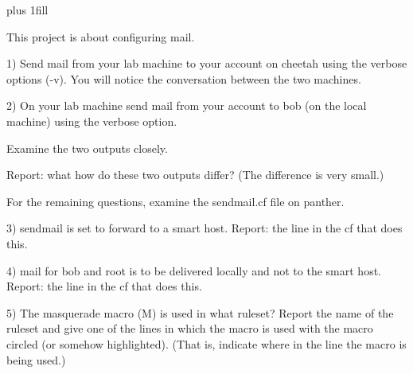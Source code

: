 
\rightskip=0pt plus 1fill

\parindent 0pt

This project is about configuring mail.

1) Send mail from your lab machine to your account on {\ltt{}cheetah}
using the verbose options ({\ltt{}-v}).
You will notice the conversation between the two machines.

2) On your lab machine send mail from your account to bob (on the
local machine) using the verbose option.

Examine the two outputs closely.

Report: what how do these two outputs differ?
(The difference is very small.)

For the remaining questions, examine the {\ltt{}sendmail.cf}
file on {\ltt{}panther}.

3) sendmail is set to forward to a smart host.
Report: the line in the {\ltt{}cf} that does this.

4) mail for {\ltt{}bob} and {\ltt{}root} is to be delivered locally and
not to the smart host.
Report: the line in the {\ltt{}cf} that does this.

5) The masquerade macro ({\ltt{}M}) is used in what ruleset?
Report the name of the ruleset and give one of the lines
in which the macro is used with the macro circled (or
somehow highlighted).
(That is, indicate where in the line the macro is being used.)
\bye
